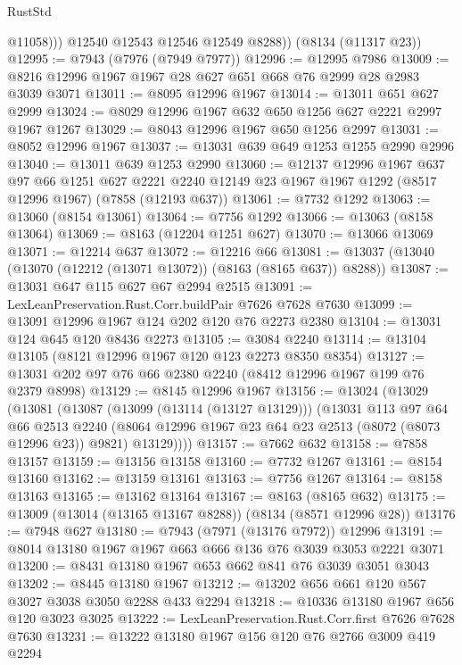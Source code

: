 \begin{lexlean}{RustStd}
\begin{coremodule}
              @11058)))
        @12540
        @12543
        @12546
        @12549
        @8288))
    (@8134 (@11317 @23))
@12995 := @7943 (@7976 (@7949 @7977))
@12996 := @12995 @7986
@13009 := @8216 @12996 @1967 @1967 @28 @627 @651 @668 @76 @2999 @28 @2983 @3039 @3071
@13011 := @8095 @12996 @1967
@13014 := @13011 @651 @627 @2999
@13024 := @8029 @12996 @1967 @632 @650 @1256 @627 @2221 @2997 @1967 @1267
@13029 := @8043 @12996 @1967 @650 @1256 @2997
@13031 := @8052 @12996 @1967
@13037 := @13031 @639 @649 @1253 @1255 @2990 @2996
@13040 := @13011 @639 @1253 @2990
@13060 := @12137
    @12996
    @1967
    @637
    @97
    @66
    @1251
    @627
    @2221
    @2240
    @12149
    @23
    @1967
    @1967
    @1292
    (@8517 @12996 @1967)
    (@7858 (@12193 @637))
@13061 := @7732 @1292
@13063 := @13060 (@8154 @13061)
@13064 := @7756 @1292
@13066 := @13063 (@8158 @13064)
@13069 := @8163 (@12204 @1251 @627)
@13070 := @13066 @13069
@13071 := @12214 @637
@13072 := @12216 @66
@13081 := @13037 (@13040 (@13070 (@12212 (@13071 @13072)) (@8163 (@8165 @637)) @8288))
@13087 := @13031 @647 @115 @627 @67 @2994 @2515
@13091 := LexLeanPreservation.Rust.Corr.buildPair @7626 @7628 @7630
@13099 := @13091 @12996 @1967 @124 @202 @120 @76 @2273 @2380
@13104 := @13031 @124 @645 @120 @8436 @2273
@13105 := @3084 @2240
@13114 := @13104 @13105 (@8121 @12996 @1967 @120 @123 @2273 @8350 @8354)
@13127 := @13031 @202 @97 @76 @66 @2380 @2240 (@8412 @12996 @1967 @199 @76 @2379 @8998)
@13129 := @8145 @12996 @1967
@13156 := @13024
    (@13029
      (@13081
        (@13087
          (@13099 (@13114 (@13127 @13129)))
          (@13031
            @113
            @97
            @64
            @66
            @2513
            @2240
            (@8064 @12996 @1967 @23 @64 @23 @2513 (@8072 (@8073 @12996 @23)) @9821)
            @13129))))
@13157 := @7662 @632
@13158 := @7858 @13157
@13159 := @13156 @13158
@13160 := @7732 @1267
@13161 := @8154 @13160
@13162 := @13159 @13161
@13163 := @7756 @1267
@13164 := @8158 @13163
@13165 := @13162 @13164
@13167 := @8163 (@8165 @632)
@13175 := @13009 (@13014 (@13165 @13167 @8288)) (@8134 (@8571 @12996 @28))
@13176 := @7948 @627
@13180 := @7943 (@7971 (@13176 @7972)) @12996
@13191 := @8014 @13180 @1967 @1967 @663 @666 @136 @76 @3039 @3053 @2221 @3071
@13200 := @8431 @13180 @1967 @653 @662 @841 @76 @3039 @3051 @3043
@13202 := @8445 @13180 @1967
@13212 := @13202 @656 @661 @120 @567 @3027 @3038 @3050 @2288 @433 @2294
@13218 := @10336 @13180 @1967 @656 @120 @3023 @3025
@13222 := LexLeanPreservation.Rust.Corr.first @7626 @7628 @7630
@13231 := @13222 @13180 @1967 @156 @120 @76 @2766 @3009 @419 @2294

\end{coremodule}
\end{lexlean}
